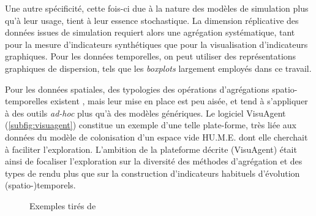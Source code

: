 \noindent Une autre spécificité, cette fois-ci due à la nature des modèles de simulation plus qu'à leur usage, tient à leur essence stochastique.
La dimension réplicative des données issues de simulation requiert alors une agrégation systématique, tant pour la mesure d'indicateurs synthétiques que pour la visualisation d'indicateurs graphiques.
Pour les données temporelles, on peut utiliser des représentations graphiques de dispersion, tels que les \textit{boxplots} largement employés dans ce travail.

\noindent Pour les données spatiales, des typologies des opérations d'agrégations spatio-temporelles existent \autocite{bach_review_2014}, mais leur mise en place est peu aisée, et tend à s'appliquer à des outils \textit{ad-hoc} plus qu'à des modèles génériques.
Le logiciel VisuAgent \autocite{cura_visuagent_2014} (\cref{subfig:visuagent}) constitue un exemple d'une telle plate-forme, très liée aux données du modèle de colonisation d'un espace vide \og HU.M.E.\fg{} \autocite{lenechet:hal-02025441} dont elle cherchait à faciliter l'exploration.
L'ambition de la plateforme décrite (\textsf{VisuAgent}) était ainsi de focaliser l'exploration sur la diversité des méthodes d'agrégation et des types de rendu plus que sur la construction d'indicateurs habituels d'évolution (spatio-)temporels.

\begin{figure}[H]
	\centering
	\hspace{5pt}
	\captionsetup[subfloat]{width=.55\linewidth}
	\captionsetup[subfloat]{width=.33\linewidth}
	\caption{Exemples tirés de \textcite{cura_visualisation_2020}}
\end{figure}



